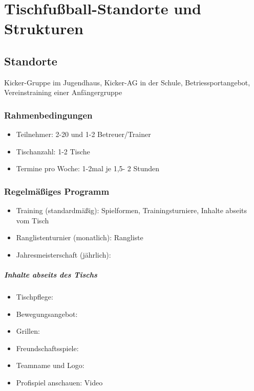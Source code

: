\chapter{Tischfußball-Standorte und Strukturen}

\section{Standorte}

Kicker-Gruppe im Jugendhaus, Kicker-AG in der Schule, Betriessportangebot, Vereinstraining einer Anfängergruppe  

\subsection{Rahmenbedingungen}

\begin{itemize}
\item Teilnehmer: 2-20 und 1-2 Betreuer/Trainer
\item Tischanzahl: 1-2 Tische
\item Termine pro Woche: 1-2mal je 1,5- 2 Stunden
\end{itemize}

\subsection{Regelmäßiges Programm}

\begin{itemize}
\item Training (standardmäßig): Spielformen, Trainingsturniere, Inhalte abseits vom Tisch   
\item Ranglistenturnier (monatlich): 
Rangliste  
\item Jahresmeisterschaft (jährlich):
\end{itemize}  

\paragraph{Inhalte abseits des Tischs}
\begin{itemize}
\item Tischpflege:  
\item Bewegungsangebot: 
\item Grillen:
\item Freundschaftsspiele:
\item Teamname und Logo:
\item Profispiel anschauen: Video 
\end{itemize} 


